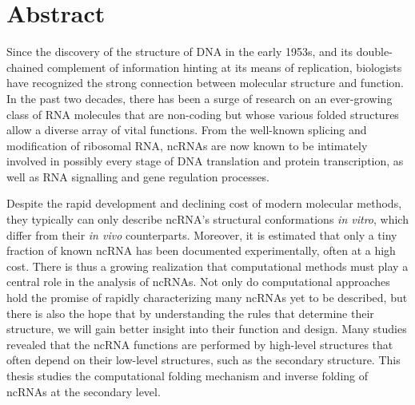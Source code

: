 \begingroup
\let\clearpage\relax
\let\cleardoublepage\relax
\let\cleardoublepage\relax

\chapter*{Abstract }


Since the discovery of the structure of \ac{DNA} in the early 1953s, and its double-chained complement of information hinting at its means of replication, biologists have recognized the strong connection between molecular structure and function. In the past two decades, there has been a surge of research on an ever-growing class of \ac{RNA} molecules that are non-coding but whose various folded structures allow a diverse array of vital functions. From the well-known splicing and modification of ribosomal \ac{RNA}, \acp{ncRNA} are now known to be intimately involved in possibly every stage of \ac{DNA} translation and protein transcription, as well as \ac{RNA} signalling and gene regulation processes.

Despite the rapid development and declining cost of modern molecular methods, they typically can only describe \ac{ncRNA}'s structural conformations \textit{in vitro}, which differ from their \textit{in vivo} counterparts. Moreover, it is estimated that only a tiny fraction of known \ac{ncRNA} has been documented experimentally, often at a high cost. There is thus a growing realization that computational methods must play a central role in the analysis of \acp{ncRNA}. Not only do computational approaches hold the promise of rapidly characterizing many \acp{ncRNA} yet to be described, but there is also the hope that by understanding the rules that determine their structure, we will gain better insight into their function and design. Many studies revealed that the \ac{ncRNA} functions are performed by high-level structures that often depend on their low-level structures, such as the secondary structure. This thesis studies the computational folding mechanism and inverse folding of \acp{ncRNA} at the secondary level. 

